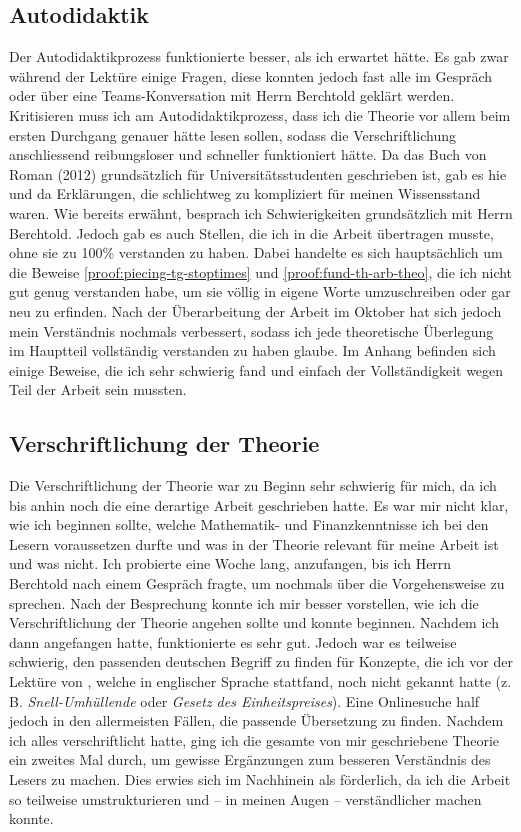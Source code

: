 \documentclass[11pt]{report} %
\begin{document}
\subsection{Autodidaktik}
Der Autodidaktikprozess funktionierte besser, als ich erwartet hätte. Es gab zwar während der Lektüre einige Fragen, diese konnten jedoch fast alle im Gespräch oder über eine Teams-Konversation mit Herrn Berchtold geklärt werden. Kritisieren muss ich am Autodidaktikprozess, dass ich die Theorie vor allem beim ersten Durchgang genauer hätte lesen sollen, sodass die Verschriftlichung anschliessend reibungsloser und schneller funktioniert hätte. Da das Buch von Roman (2012) grundsätzlich für Universitätsstudenten geschrieben ist, gab es hie und da Erklärungen, die schlichtweg zu kompliziert für meinen Wissensstand waren. Wie bereits erwähnt, besprach ich Schwierigkeiten grundsätzlich mit Herrn Berchtold. Jedoch gab es auch Stellen, die ich in die Arbeit übertragen musste, ohne sie zu 100\% verstanden zu haben. Dabei handelte es sich hauptsächlich um die Beweise \ref{proof:piecing-tg-stoptimes} und \ref{proof:fund-th-arb-theo}, die ich nicht gut genug verstanden habe, um sie völlig in eigene Worte umzuschreiben oder gar neu zu erfinden. Nach der Überarbeitung der Arbeit im Oktober hat sich jedoch mein Verständnis nochmals verbessert, sodass ich jede theoretische Überlegung im Hauptteil vollständig verstanden zu haben glaube. Im Anhang befinden sich einige Beweise, die ich sehr schwierig fand und einfach der Vollständigkeit wegen Teil der Arbeit sein mussten.
\subsection{Verschriftlichung der Theorie}
Die Verschriftlichung der Theorie war zu Beginn sehr schwierig für mich, da ich bis anhin noch die eine derartige Arbeit geschrieben hatte. Es war mir nicht klar, wie ich beginnen sollte, welche Mathematik- und Finanzkenntnisse ich bei den Lesern voraussetzen durfte und was in der Theorie relevant für meine Arbeit ist und was nicht. Ich probierte eine Woche lang, anzufangen, bis ich Herrn Berchtold nach einem Gespräch fragte, um nochmals über die Vorgehensweise zu sprechen. Nach der Besprechung konnte ich mir besser vorstellen, wie ich die Verschriftlichung der Theorie angehen sollte und konnte beginnen. Nachdem ich dann angefangen hatte, funktionierte es sehr gut. Jedoch war es teilweise schwierig, den passenden deutschen Begriff zu finden für Konzepte, die ich vor der Lektüre von \textcite{Roman2012-sk}, welche in englischer Sprache stattfand, noch nicht gekannt hatte (z. B. \textit{Snell-Umhüllende} oder \textit{Gesetz des Einheitspreises}). Eine Onlinesuche half jedoch in den allermeisten Fällen, die passende Übersetzung zu finden. Nachdem ich alles verschriftlicht hatte, ging ich die gesamte von mir geschriebene Theorie ein zweites Mal durch, um gewisse Ergänzungen zum besseren Verständnis des Lesers zu machen. Dies erwies sich im Nachhinein als förderlich, da ich die Arbeit so teilweise umstrukturieren und -- in meinen Augen -- verständlicher machen konnte. 
\end{document}

